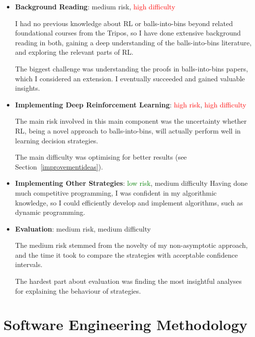 \begin{itemize}

    \item \textbf{Background Reading}: \textcolor{YellowOrange}{medium risk}, \textcolor{Red}{high difficulty}
    
    I had no previous knowledge about RL or balls-into-bins beyond related foundational courses from the Tripos, so I have done extensive background reading in both, gaining a deep understanding of the balls-into-bins literature, and exploring the relevant parts of RL.
    
    The biggest challenge was understanding the proofs in balls-into-bins papers, which I considered an extension. I eventually succeeded and gained valuable insights.
    
    \item \textbf{Implementing Deep Reinforcement Learning}: \textcolor{red}{high risk}, \textcolor{red}{high difficulty}
    
    The main risk involved in this main component was the uncertainty whether RL, being a novel approach to balls-into-bins, will actually perform well in learning decision strategies.
    
    The main difficulty was optimising \DQL for better results (see Section~\ref{improvementideas}).
    
    \item \textbf{Implementing Other Strategies}: \textcolor{green}{low risk}, \textcolor{YellowOrange}{medium difficulty}
    Having done much competitive programming, I was confident in my algorithmic knowledge, so I could efficiently develop and implement algorithms, such as dynamic programming.
    
    \item \textbf{Evaluation}: \textcolor{YellowOrange}{medium risk}, \textcolor{YellowOrange}{medium difficulty}
    
    The medium risk stemmed from the novelty of my non-asymptotic approach, and the time it took to compare the strategies with acceptable confidence intervals.
    
    The hardest part about evaluation was finding the most insightful analyses for explaining the behaviour of strategies.
    
\end{itemize}


\section{Software Engineering Methodology}


